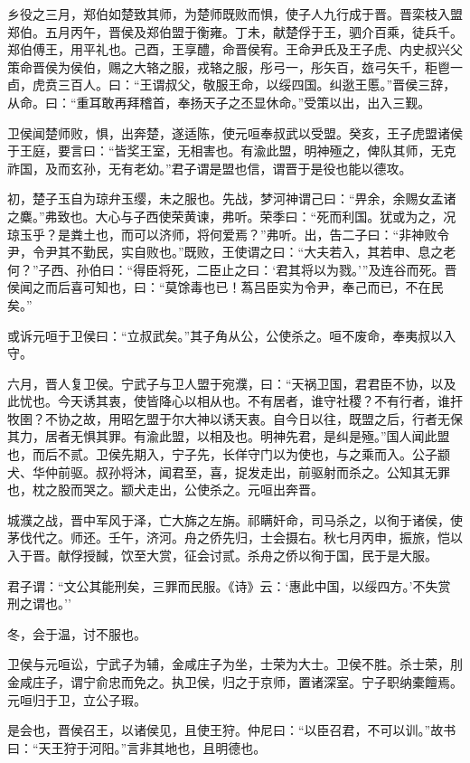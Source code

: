 \documentclass[]{article}
\begin{document}
乡役之三月，郑伯如楚致其师，为楚师既败而惧，使子人九行成于晋。晋栾枝入盟郑伯。五月丙午，晋侯及郑伯盟于衡雍。丁未，献楚俘于王，驷介百乘，徒兵千。郑伯傅王，用平礼也。己酉，王享醴，命晋侯宥。王命尹氏及王子虎、内史叔兴父策命晋侯为侯伯，赐之大辂之服，戎辂之服，彤弓一，彤矢百，玈弓矢千，秬鬯一卣，虎贲三百人。曰：``王谓叔父，敬服王命，以绥四国。纠逖王慝。''晋侯三辞，从命。曰：``重耳敢再拜稽首，奉扬天子之丕显休命。''受策以出，出入三觐。

卫侯闻楚师败，惧，出奔楚，遂适陈，使元咺奉叔武以受盟。癸亥，王子虎盟诸侯于王庭，要言曰：``皆奖王室，无相害也。有渝此盟，明神殛之，俾队其师，无克祚国，及而玄孙，无有老幼。''君子谓是盟也信，谓晋于是役也能以德攻。

初，楚子玉自为琼弁玉缨，未之服也。先战，梦河神谓己曰：``畀余，余赐女孟诸之麋。''弗致也。大心与子西使荣黄谏，弗听。荣季曰：``死而利国。犹或为之，况琼玉乎？是粪土也，而可以济师，将何爱焉？''弗听。出，告二子曰：``非神败令尹，令尹其不勤民，实自败也。''既败，王使谓之曰：``大夫若入，其若申、息之老何？''子西、孙伯曰：``得臣将死，二臣止之曰：`君其将以为戮。'''及连谷而死。晋侯闻之而后喜可知也，曰：``莫馀毒也已！蒍吕臣实为令尹，奉己而已，不在民矣。''

或诉元咺于卫侯曰：``立叔武矣。''其子角从公，公使杀之。咺不废命，奉夷叔以入守。

六月，晋人复卫侯。宁武子与卫人盟于宛濮，曰：``天祸卫国，君君臣不协，以及此忧也。今天诱其衷，使皆降心以相从也。不有居者，谁守社稷？不有行者，谁扞牧圉？不协之故，用昭乞盟于尔大神以诱天衷。自今日以往，既盟之后，行者无保其力，居者无惧其罪。有渝此盟，以相及也。明神先君，是纠是殛。''国人闻此盟也，而后不贰。卫侯先期入，宁子先，长佯守门以为使也，与之乘而入。公子颛犬、华仲前驱。叔孙将沐，闻君至，喜，捉发走出，前驱射而杀之。公知其无罪也，枕之股而哭之。颛犬走出，公使杀之。元咺出奔晋。

城濮之战，晋中军风于泽，亡大旆之左旃。祁瞒奸命，司马杀之，以徇于诸侯，使茅伐代之。师还。壬午，济河。舟之侨先归，士会摄右。秋七月丙申，振旅，恺以入于晋。献俘授馘，饮至大赏，征会讨贰。杀舟之侨以徇于国，民于是大服。

君子谓：``文公其能刑矣，三罪而民服。《诗》云：`惠此中国，以绥四方。'不失赏刑之谓也。''

冬，会于温，讨不服也。

卫侯与元咺讼，宁武子为辅，金咸庄子为坐，士荣为大士。卫侯不胜。杀士荣，刖金咸庄子，谓宁俞忠而免之。执卫侯，归之于京师，置诸深室。宁子职纳橐饘焉。元咺归于卫，立公子瑕。

是会也，晋侯召王，以诸侯见，且使王狩。仲尼曰：``以臣召君，不可以训。''故书曰：``天王狩于河阳。''言非其地也，且明德也。
\end{document}
